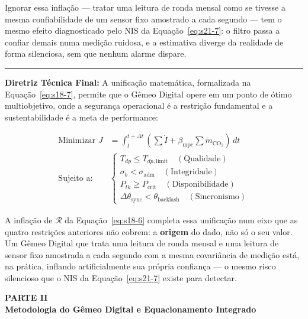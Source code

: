 \documentclass[12pt,a4paper]{article}
\numberwithin{equation}{section}
\numberwithin{table}{section}
\numberwithin{figure}{section}
\begin{document}
{Ignorar essa inflação — tratar uma leitura de ronda mensal como se tivesse a mesma confiabilidade de um sensor fixo amostrado a cada segundo — tem o mesmo efeito diagnosticado pelo NIS da Equação~\eqref{eq:s21-7}: o filtro passa a confiar demais numa medição ruidosa, e a estimativa diverge da realidade de forma silenciosa, sem que nenhum alarme dispare.

\vspace{1em}
\hrule
\vspace{1em}

\textbf{Diretriz Técnica Final:} A unificação matemática, formalizada na Equação~\eqref{eq:s18-7}, permite que o Gêmeo Digital opere em um ponto de ótimo multiobjetivo, onde a segurança operacional é a restrição fundamental e a sustentabilidade é a meta de performance:

\begin{equation}\label{eq:s18-7}
\begin{aligned}
	\text{Minimizar } J &= \int_{t}^{t+\Delta t} \left( \sum \dot{I} + \beta_{\text{mpc}} \sum \dot{m}_{\text{CO}_2} \right) \, dt \\[10pt]
	\text{Sujeito a: } & \begin{cases} T_{dp} \le T_{dp,\text{limit}} \quad (\text{Qualidade}) \\ \sigma_{b} < \sigma_{\text{adm}} \quad (\text{Integridade}) \\ P_{tk} \ge P_{\text{crit}} \quad (\text{Disponibilidade}) \\ \Delta \theta_{\text{sync}} < \theta_{\text{backlash}} \quad (\text{Sincronismo}) \end{cases}
\end{aligned}
\end{equation}

A inflação de $\mathcal{R}$ da Equação~\eqref{eq:s18-6} completa essa unificação num eixo que as quatro restrições anteriores não cobrem: a \textbf{origem} do dado, não só o seu valor. Um Gêmeo Digital que trata uma leitura de ronda mensal e uma leitura de sensor fixo amostrada a cada segundo com a mesma covariância de medição está, na prática, inflando artificialmente sua própria confiança — o mesmo risco silencioso que o NIS da Equação~\eqref{eq:s21-7} existe para detectar.

\clearpage
\thispagestyle{empty}
{}
\vspace*{\fill}
\begin{center}
	{\Huge\bfseries PARTE II}\\[2em]
	{\huge\bfseries Metodologia do Gêmeo Digital e Equacionamento Integrado}
\end{center}
\vspace*{\fill}
\clearpage

}
\end{document}

